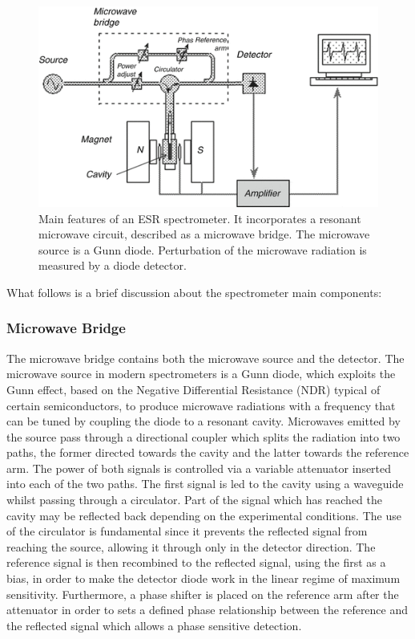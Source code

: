 \documentclass[journal]{IEEEtran}
\begin{document}
\begin{figure}[h!]
    \centering
    \includegraphics[scale=0.4]{lab2-EPR_setupLayout.png}
    \caption{Main features of an ESR spectrometer. It incorporates a resonant microwave circuit, described as a microwave bridge. The microwave source is a Gunn diode. Perturbation of the microwave radiation is measured by a diode detector.}
    \label{fig:ESR_setupLayout}
\end{figure}

\noindent What follows is a brief discussion about the spectrometer main components:

\subsubsection{Microwave Bridge}

The microwave bridge contains both the microwave source and the detector. The microwave source in modern spectrometers is a Gunn diode, which exploits the Gunn effect, based on the Negative Differential Resistance (NDR) typical of certain semiconductors, to produce microwave radiations with a frequency that can be tuned by coupling the diode to a resonant cavity.
Microwaves emitted by the source pass through a directional coupler which splits the radiation into two paths, the former directed towards the cavity and the latter towards the reference arm. The power of both signals is controlled via a variable attenuator inserted into each of the two paths. The first signal is led to the cavity using a waveguide whilst passing through a circulator. Part of the signal which has reached the cavity may be reflected back depending on the experimental conditions. The use of the circulator is fundamental since it prevents the reflected signal from reaching the source, allowing it through only in the detector direction. The reference signal is then recombined to the reflected signal, using the first as a bias, in order to make the detector diode work in the linear regime of maximum sensitivity. Furthermore, a phase shifter is placed on the reference arm after the attenuator in order to sets a defined phase relationship between the reference and the reflected signal which allows a phase sensitive detection.
\end{document}
